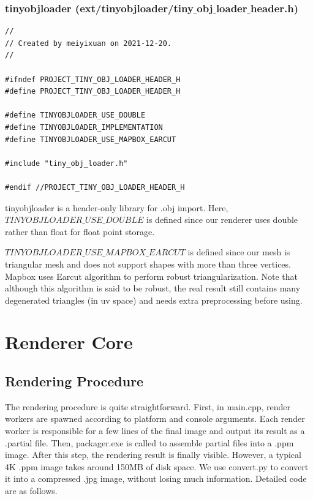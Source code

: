 \documentclass[utf8]{article}
\begin{document}
\subsubsection{tinyobjloader (ext/tinyobjloader/tiny$\_$obj$\_$loader$\_$header.h)}
\begin{lstlisting}[style=CStyle]
//
// Created by meiyixuan on 2021-12-20.
//

#ifndef PROJECT_TINY_OBJ_LOADER_HEADER_H
#define PROJECT_TINY_OBJ_LOADER_HEADER_H

#define TINYOBJLOADER_USE_DOUBLE
#define TINYOBJLOADER_IMPLEMENTATION
#define TINYOBJLOADER_USE_MAPBOX_EARCUT

#include "tiny_obj_loader.h"

#endif //PROJECT_TINY_OBJ_LOADER_HEADER_H

\end{lstlisting}
tinyobjloader is a header-only library for .obj import. Here, $TINYOBJLOADER\_USE\_DOUBLE$ is defined since our renderer uses double rather than float for float point storage.

$TINYOBJLOADER\_USE\_MAPBOX\_EARCUT$ is defined since our mesh is triangular mesh and does not support shapes with more than three vertices. Mapbox uses Earcut algorithm to perform robust triangularization. Note that although this algorithm is said to be robust, the real result still contains many degenerated triangles (in uv space) and needs extra preprocessing before using.

\section{Renderer Core}

\subsection{Rendering Procedure}
The rendering procedure is quite straightforward. First, in main.cpp, render workers are spawned according to platform and console arguments. Each render worker is responsible for a few lines of the final image and output its result as a .partial file. Then, packager.exe is called to assemble partial files into a .ppm image. After this step, the rendering result is finally visible. However, a typical 4K .ppm image takes around 150MB of disk space. We use convert.py to convert it into a compressed .jpg image, without losing much information. Detailed code are as follows.
\end{document}

